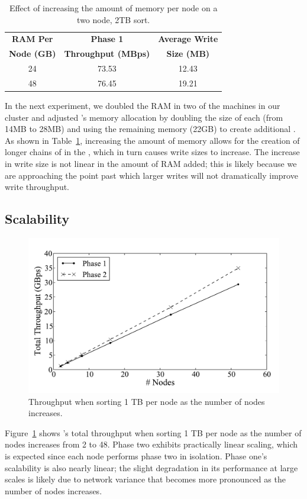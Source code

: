 \begin{table}
\centering
\caption{\label{table:bigmem}Effect of increasing the amount of memory per
  node on a two node, 2TB sort.}
\begin{tabular}{|c|c|c|}
\hline
\textbf{RAM Per}  & \textbf{Phase 1}  & \textbf{Average Write} \\
\textbf{Node (GB)} & \textbf{Throughput (MBps)} & \textbf{Size (MB)} \\
\hline
24 & 73.53 & 12.43 \\
48 & 76.45 & 19.21 \\
\hline
\end{tabular}
\end{table}

In the next experiment, we doubled the RAM in two of the machines in our
cluster and adjusted \tritonsort's memory allocation by doubling the size of
each \writerbuffer (from 14MB to 28MB) and using the remaining memory (22GB)
to create additional \ldbuffers. As shown in Table~\ref{table:bigmem},
increasing the amount of memory allows for the creation of longer chains of
\ldbuffers in the \ldts, which in turn causes write sizes to increase. The
increase in write size is not linear in the amount of RAM added; this is likely
because we are approaching the point past which larger writes will not
dramatically improve write throughput.

\subsection{\tritonsort Scalability}

\begin{figure}
    \centering
    \includegraphics[width=\columnwidth]{tritonsort/graphs/scalability.pdf}

    \caption{\label{fig:scalability}Throughput when sorting 1 TB per node as the number of nodes increases.}
\end{figure}

Figure~\ref{fig:scalability} shows \tritonsort's total throughput when sorting
1 TB per node as the number of nodes increases from 2 to 48. Phase two exhibits
practically linear scaling, which is expected since each node performs phase
two in isolation.  Phase one's scalability is also nearly linear; the slight
degradation in its performance at large scales is likely due to network
variance that becomes more pronounced as the number of nodes increases.

